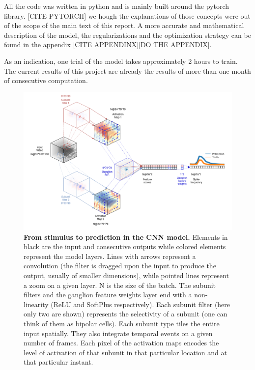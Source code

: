All the code was written in python and is mainly built around the pytorch
library. [CITE PYTORCH]
we hough the explanations of those concepts were out of the scope of the main
text of this report. A more accurate and mathematical description of the model,
the regularizations and the optimization strategy can be found in the appendix
    [CITE APPENDINX][DO
        THE APPENDIX].

As an indication, one trial of the model takes approximately 2 hours to train.
The current results of this project are already the results of more than one
month of consecutive computation.

\begin{figure}
    \centering
    \includegraphics[width=\textwidth]{pics/CNNSimpleWithImgs.png}
    \caption{\textbf{From stimulus to prediction in the CNN model.} Elements in
        black are the input and consecutive outputs while colored
        elements
        represent the model layers. Lines with arrows represent a convolution
        (the
        filter is dragged upon the input to produce the output, usually of
        smaller
        dimensions), while pointed lines represent a zoom on a given layer. N
        is the size of the batch. The subunit filters and the ganglion feature
        weights layer end
        with a non-linearity (ReLU and SoftPlus respectively).
        Each subunit filter (here only two are shown) represents the
        selectivity
        of a subunit (one can think of them as bipolar cells). Each subunit
        type tiles the entire input spatially. They also integrate temporal
        events on a given number of frames. Each pixel of the
        activation maps encodes the level of activation of that subunit in that
        particular location and at that particular instant.
}
\end{figure}
